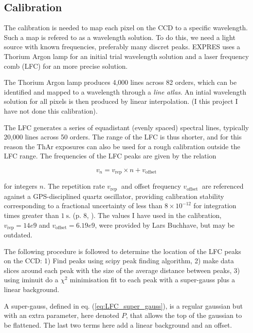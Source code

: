 \subsection{Calibration} 


    The calibration is needed to map each pixel on the CCD to a specific wavelength. Such a map is refered to as a wavelength solution. To do this, we need a light source with known frequencies, preferably many discret peaks. EXPRES uses a Thorium Argon lamp for an initial trial wavelength solution and a laser frequency comb (LFC) for an more precise solution.
    
    The Thorium Argon lamp produces 4,000 lines across 82 orders, which can be identified and mapped to a wavelength through a \emph{line atlas}. An intial wavelength solution for all pixels is then produced by linear interpolation. (I this project I have not done this calibration).

    The LFC generates a series of equadistant (evenly spaced) spectral lines, typically 20,000 lines across 50 orders. The range of the LFC is thus shorter, and for this reason the ThAr exposures can also be used for a rough calibration outside the LFC range. The frequencies of the LFC peaks are given by the relation
    
    \begin{equation}
        \label{eq:LFC_freq_eq}
        v_{n}=v_{\text{rep}} \times n+v_{\text{offset}}
    \end{equation}

    for integers $n$. The repetition rate $v_{\text {rep }}$ and offset frequency $v_{\text {offset }}$ are referenced against a GPS-disciplined quartz oscillator, providing calibration stability corresponding to a fractional uncertainty of less than $8 \times 10^{-12}$ for integration times greater than $1 \mathrm{~s}$. (p. 8, \cite{first_RV_from_EXPRES}). The values I have used in the calibration, $v_{\text{rep}} = 14e9$ and $v_{\text{offset}} = 6.19e9$, were provided by Lars Buchhave, but may be outdated. 

    The following procedure is followed to determine the location of the LFC peaks on the CCD: 1) Find peaks using scipy peak finding algorithm, 2) make data slices around each peak with the size of the average distance between peaks, 3) using iminuit do a $\chi^2$ minimisation fit to each peak with a super-gauss plus a linear background.

    A super-gauss, defined in eq. (\ref{eq:LFC_super_gauss}), is a regular gaussian but with an extra parameter, here denoted $P$, that allows the top of the gaussian to be flattened. The last two terms here add a linear background and an offset. 
    
